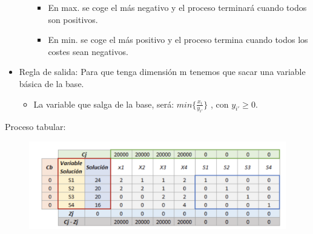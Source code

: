\documentclass[12pt, twoside, openright]{report} %
\begin{document}
\begin{itemize}
\begin{enumerate}
        \begin{itemize}
      
        \item
          En max. se coge el más negativo y el proceso terminará cuando
          todos son positivos.
        \item
          En min. se coge el más positivo y el proceso termina cuando
          todos los costes sean negativos.
        \end{itemize}
      \end{enumerate}
    \item
      Regla de salida: Para que tenga dimensión m tenemos que sacar una
      variable básica de la base.

      \begin{itemize}
    
      \item
        La variable que salga de la base, será:
        \(min\{ \frac {x_i} {y_{i'}} \}\) , con \(y_{i'} \geq 0\).
      \end{itemize}
    \end{itemize}
\pagebreak
	Proceso tabular:
	\begin{figure}[H]
		{\includegraphics[scale=.3]{Untitled 11.png}}
	\end{figure}
\end{document}
